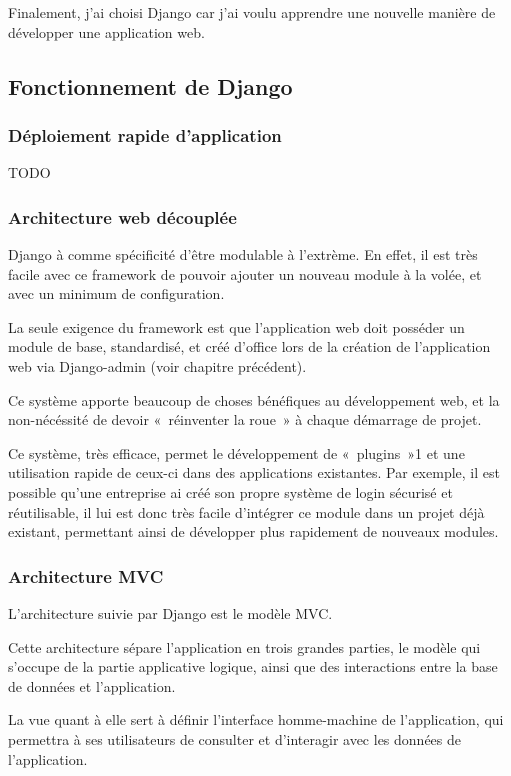 \documentclass{report}
\begin{document}
Finalement, j'ai choisi Django car j'ai voulu apprendre une nouvelle manière de développer une application web.

\subsection{Fonctionnement de Django}
\subsubsection{Déploiement rapide d'application}
TODO

\subsubsection{Architecture web découplée}
Django à comme spécificité d'être modulable à l'extrème. En effet, il est très facile avec ce framework de pouvoir ajouter un nouveau module à la volée, et avec un minimum de configuration.

La seule exigence du framework est que l'application web doit posséder un module de base, standardisé, et créé d'office lors de la création de l'application web via Django-admin (voir chapitre précédent).

Ce système apporte beaucoup de choses bénéfiques au développement web, et la non-nécéssité de devoir « réinventer la roue » à chaque démarrage de projet.

Ce système, très efficace, permet le développement de « plugins »1 et une utilisation rapide de ceux-ci dans des applications existantes.
Par exemple, il est possible qu'une entreprise ai créé son propre système de login sécurisé et réutilisable, il lui est donc très facile d'intégrer ce module dans un projet déjà existant, permettant ainsi de développer plus rapidement de nouveaux modules.

\subsubsection{Architecture MVC}
L'architecture suivie par Django est le modèle MVC.

Cette architecture sépare l'application en trois grandes parties, le modèle qui s'occupe de la partie applicative logique, ainsi que des interactions entre la base de données et l'application.

La vue quant à elle sert à définir l'interface homme-machine de l'application, qui permettra à ses utilisateurs de consulter et d'interagir avec les données de l'application.
\end{document}

